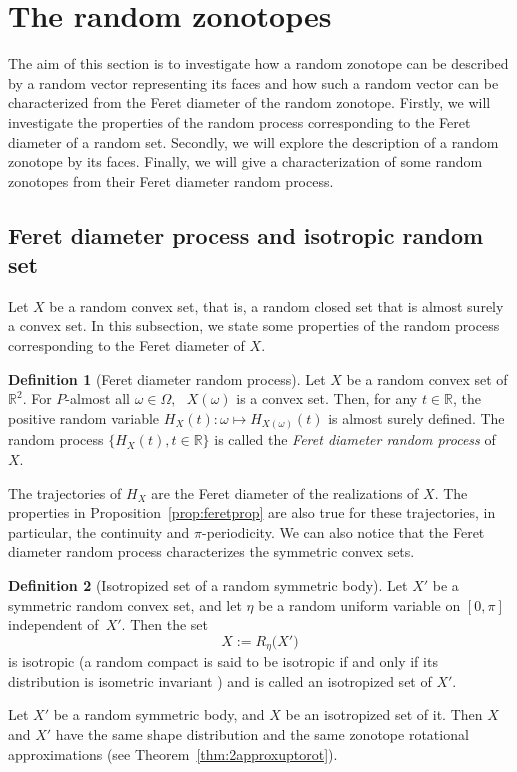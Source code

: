 \documentclass[numbers,compress,v1.0.1]{vmsta}
\theoremstyle{definition}
\newtheorem{definition}{Definition}
\begin{document}
\section{The random zonotopes}


The aim of this section is to investigate how a random zonotope can be
described by a random vector representing its faces and how such a
random vector can be characterized from the Feret diameter of the
random zonotope. Firstly, we will investigate the properties of the
random process corresponding to the Feret diameter of a random set.
Secondly, we will explore the description of a random zonotope by its
faces. Finally, we will give a characterization of some random
zonotopes from their Feret diameter random process.

\subsection{Feret diameter process and isotropic random set}
Let $X$ be a random convex set, that is, a random closed set that is
almost surely a convex set. In this subsection, we state some
properties of the random process \cite{cox1977theoryRandomProcess}
corresponding to the Feret diameter of $X$.
%
\begin{definition}[Feret diameter random process]
Let $X$ be a random convex set of $\mathbb{R}^2$. For \(P\)-almost all
$\omega\in\varOmega, \text{ } X(\omega)$ is a convex set. Then, for any
$t\in\mathbb{R}$, the positive random variable $H_X(t):\omega\mapsto
H_{X(\omega)}(t)$ is almost surely defined. The random process $
\lbrace H_X(t),t\in\mathbb{R}\rbrace$ is called the \textit{Feret
diameter random process} of~$X$.
\end{definition}
%
The trajectories of $H_X$ are the Feret diameter of the realizations of
$X$. The properties in Proposition~\ref{prop:feretprop} are also true
for these trajectories, in particular, the continuity and $\pi
$-periodicity. We can also notice that the Feret diameter random
process characterizes the symmetric convex sets.

\begin{definition}[Isotropized set of a random symmetric body]
Let $X'$ be a symmetric random convex set, and let $\eta$ be a random
uniform variable on $[0,\pi]$ independent of~$X'$. Then the set
%
\begin{equation*}
X:=R_\eta\bigl(X'\bigr)
\end{equation*}
%
is isotropic (a random compact is said to be isotropic if and only if
its distribution is isometric invariant \cite{chiu2013stochastic}) and
is called an isotropized set of $X'$.
\label{def:isotroVersion}
\end{definition}
%
Let $X'$ be a random symmetric body, and $X$ be an isotropized set of
it. Then $X$ and $X'$ have the same shape distribution and the same
zonotope rotational approximations (see Theorem~\ref{thm:2approxuptorot}).
\end{document}

